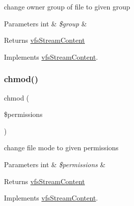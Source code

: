 change owner group of file to given group


\begin{DoxyParams}[1]{Parameters}
int & {\em \$group} & \\
\hline
\end{DoxyParams}
\begin{DoxyReturn}{Returns}
\mbox{\hyperlink{interfaceorg_1_1bovigo_1_1vfs_1_1vfs_stream_content}{vfs\+Stream\+Content}} 
\end{DoxyReturn}


Implements \mbox{\hyperlink{interfaceorg_1_1bovigo_1_1vfs_1_1vfs_stream_content_ae3667c8a6ad2f23f1163ba4533a20525}{vfs\+Stream\+Content}}.

\mbox{\label{classorg_1_1bovigo_1_1vfs_1_1vfs_stream_abstract_content_a6c64687533218867184ace2d0015b230}} 
\subsubsection{\texorpdfstring{chmod()}{chmod()}}
{\footnotesize\ttfamily chmod (\begin{DoxyParamCaption}\item[{}]{\$permissions }\end{DoxyParamCaption})}

change file mode to given permissions


\begin{DoxyParams}[1]{Parameters}
int & {\em \$permissions} & \\
\hline
\end{DoxyParams}
\begin{DoxyReturn}{Returns}
\mbox{\hyperlink{interfaceorg_1_1bovigo_1_1vfs_1_1vfs_stream_content}{vfs\+Stream\+Content}} 
\end{DoxyReturn}


Implements \mbox{\hyperlink{interfaceorg_1_1bovigo_1_1vfs_1_1vfs_stream_content_a6c64687533218867184ace2d0015b230}{vfs\+Stream\+Content}}.

\mbox{\label{classorg_1_1bovigo_1_1vfs_1_1vfs_stream_abstract_content_adc7dd498252edfe9eef1bdb602edcbdb}} 

